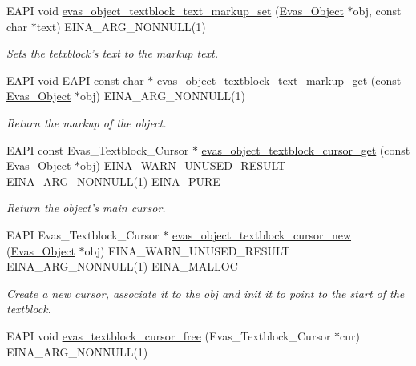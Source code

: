 \begin{DoxyCompactItemize}
EAPI void \hyperlink{group__Evas__Object__Textblock_gadaed9758086de4545aa6fb561445816f}{evas\_\-object\_\-textblock\_\-text\_\-markup\_\-set} (\hyperlink{group__Evas__Object__Group_ga9e19e6dd1f517a0ba437c0114d3e7c97}{Evas\_\-Object} $\ast$obj, const char $\ast$text) EINA\_\-ARG\_\-NONNULL(1)
\begin{DoxyCompactList}\small\item\em Sets the tetxblock's text to the markup text. \item\end{DoxyCompactList}\item 
EAPI void EAPI const char $\ast$ \hyperlink{group__Evas__Object__Textblock_ga0896326ca8d9ca1dd194f322d0bc87b2}{evas\_\-object\_\-textblock\_\-text\_\-markup\_\-get} (const \hyperlink{group__Evas__Object__Group_ga9e19e6dd1f517a0ba437c0114d3e7c97}{Evas\_\-Object} $\ast$obj) EINA\_\-ARG\_\-NONNULL(1)
\begin{DoxyCompactList}\small\item\em Return the markup of the object. \item\end{DoxyCompactList}\item 
EAPI const Evas\_\-Textblock\_\-Cursor $\ast$ \hyperlink{group__Evas__Object__Textblock_ga2bbd5e4e1cc36e18790dc09fbd2a6c18}{evas\_\-object\_\-textblock\_\-cursor\_\-get} (const \hyperlink{group__Evas__Object__Group_ga9e19e6dd1f517a0ba437c0114d3e7c97}{Evas\_\-Object} $\ast$obj) EINA\_\-WARN\_\-UNUSED\_\-RESULT EINA\_\-ARG\_\-NONNULL(1) EINA\_\-PURE
\begin{DoxyCompactList}\small\item\em Return the object's main cursor. \item\end{DoxyCompactList}\item 
EAPI Evas\_\-Textblock\_\-Cursor $\ast$ \hyperlink{group__Evas__Object__Textblock_ga6f6242cc087a6cc65196b09e813e2c45}{evas\_\-object\_\-textblock\_\-cursor\_\-new} (\hyperlink{group__Evas__Object__Group_ga9e19e6dd1f517a0ba437c0114d3e7c97}{Evas\_\-Object} $\ast$obj) EINA\_\-WARN\_\-UNUSED\_\-RESULT EINA\_\-ARG\_\-NONNULL(1) EINA\_\-MALLOC
\begin{DoxyCompactList}\small\item\em Create a new cursor, associate it to the obj and init it to point to the start of the textblock. \item\end{DoxyCompactList}\item 
EAPI void \hyperlink{group__Evas__Object__Textblock_gaec3e250258e2f587381bcd1539469137}{evas\_\-textblock\_\-cursor\_\-free} (Evas\_\-Textblock\_\-Cursor $\ast$cur) EINA\_\-ARG\_\-NONNULL(1)

\end{DoxyCompactItemize}
